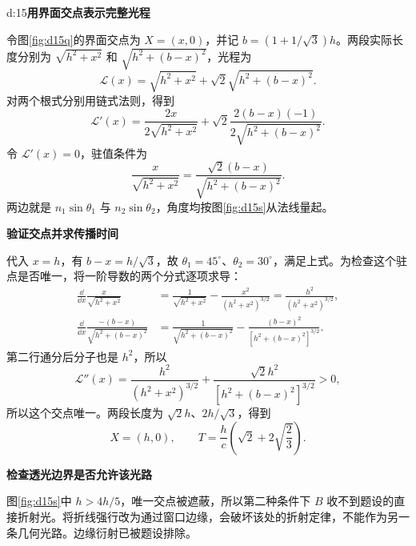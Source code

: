 \begin{drillsolution}{d:15}\textbf{用界面交点表示完整光程}\par\nobreak
令图\ref{fig:d15q}的界面交点为 $X=(x,0)$，并记 $b=(1+1/\sqrt3)h$。两段实际长度分别为 $\sqrt{h^2+x^2}$ 和 $\sqrt{h^2+(b-x)^2}$，光程为
\[
\mathcal L(x)=\sqrt{h^2+x^2}+\sqrt2\sqrt{h^2+(b-x)^2}.
\]
对两个根式分别用链式法则，得到
\[
 \mathcal L'(x)=\frac{2x}{2\sqrt{h^2+x^2}}
 +\sqrt2\frac{2(b-x)(-1)}{2\sqrt{h^2+(b-x)^2}}.
\]
令 $\mathcal L'(x)=0$，驻值条件为
\[
\frac{x}{\sqrt{h^2+x^2}}
=\frac{\sqrt2(b-x)}{\sqrt{h^2+(b-x)^2}}.
\]
两边就是 $n_1\sin\theta_1$ 与 $n_2\sin\theta_2$，角度均按图\ref{fig:d15s}从法线量起。

\par\medskip{}\noindent\textbf{验证交点并求传播时间}\par\nobreak
代入 $x=h$，有 $b-x=h/\sqrt3$，故 $\theta_1=45^\circ$、$\theta_2=30^\circ$，满足上式。为检查这个驻点是否唯一，将一阶导数的两个分式逐项求导：
\begin{align*}
 \frac{\dd}{\dd x}\frac{x}{\sqrt{h^2+x^2}}
 &=\frac1{\sqrt{h^2+x^2}}-\frac{x^2}{(h^2+x^2)^{3/2}}
 =\frac{h^2}{(h^2+x^2)^{3/2}},\\
 \frac{\dd}{\dd x}\frac{-(b-x)}{\sqrt{h^2+(b-x)^2}}
 &=\frac1{\sqrt{h^2+(b-x)^2}}
 -\frac{(b-x)^2}{[h^2+(b-x)^2]^{3/2}}.
\end{align*}
第二行通分后分子也是 $h^2$，所以
\[
\mathcal L''(x)=\frac{h^2}{(h^2+x^2)^{3/2}}
+\frac{\sqrt2h^2}{[h^2+(b-x)^2]^{3/2}}>0,
\]
所以这个交点唯一。两段长度为 $\sqrt2h$、$2h/\sqrt3$，得到
\[
\boxed{X=(h,0)},\qquad
\boxed{T=\frac hc\left(\sqrt2+2\sqrt{\frac23}\right)}.
\]

\par\medskip{}\noindent\textbf{检查透光边界是否允许该光路}\par\nobreak
图\ref{fig:d15s}中 $h>4h/5$，唯一交点被遮蔽，所以第二种条件下 $B$ 收不到题设的直接折射光。将折线强行改为通过窗口边缘，会破坏该处的折射定律，不能作为另一条几何光路。边缘衍射已被题设排除。
\end{drillsolution}
